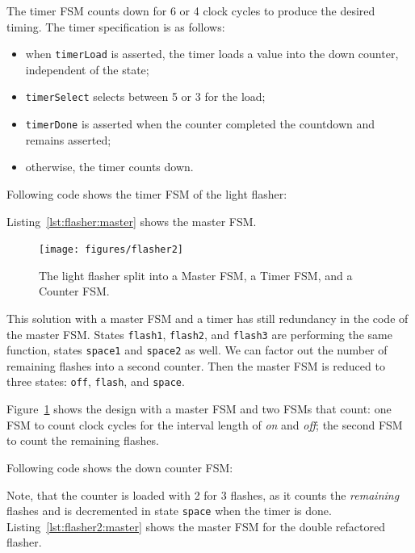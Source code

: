\documentclass[%
    10pt,
    headinclude, footexclude,
    openright, %
    notitlepage,
    cleardoubleempty,
    headsepline,
    pointlessnumbers,
    bibtotoc, idxtotoc,
    ]{scrbook}
\newcommand{\code}[1]{{\small{\texttt{#1}}}}
\begin{document}
The timer FSM counts down for 6 or 4 clock cycles to produce the desired timing.
The timer specification is as follows:

\begin{itemize}
\item when \code{timerLoad} is asserted, the timer loads a value into the down counter,
independent of the state;
\item \code{timerSelect} selects between 5 or 3 for the load;
\item \code{timerDone} is asserted when the counter completed the countdown
and remains asserted;
\item otherwise, the timer counts down.
\end{itemize}

\noindent Following code shows the timer FSM of the light flasher:


\noindent Listing~\ref{lst:flasher:master} shows the master FSM.


\begin{figure}
  \centering
  \texttt{[image: figures/flasher2]}
  \caption{The light flasher split into a Master FSM, a Timer FSM, and a Counter FSM.}
  \label{fig:flasher2}
\end{figure}

This solution with a master FSM and a timer has still redundancy in the code
of the master FSM. States \code{flash1}, \code{flash2}, and \code{flash3}
are performing the same function, states \code{space1} and \code{space2} as well.
We can factor out the number of remaining flashes into a second counter.
Then the master FSM is reduced to three states: \code{off}, \code{flash},
and \code{space}.

Figure~\ref{fig:flasher2} shows the design with a master FSM and two FSMs
that count: one FSM to count clock cycles for the interval length of \emph{on}
and \emph{off}; the second FSM to count the remaining flashes.

Following code shows the down counter FSM:


\noindent Note, that the counter is loaded with 2 for 3 flashes, as it counts the
\emph{remaining} flashes and is decremented in state \code{space} when the timer
is done. Listing~\ref{lst:flasher2:master} shows the master FSM for the double refactored flasher.
\end{document}
